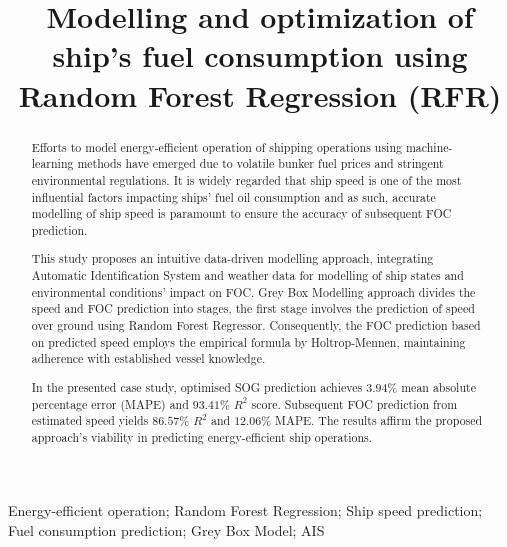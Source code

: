 \documentclass[]{interact}
\theoremstyle{plain}%
\theoremstyle{definition}
\theoremstyle{remark}
\begin{document}

\title{Modelling and optimization of ship's fuel consumption using Random Forest Regression (RFR)}

\author{
}

\maketitle

\begin{abstract}
Efforts to model energy-efficient operation of shipping operations using machine-learning methods have emerged due to volatile bunker fuel prices and stringent environmental regulations. It is widely regarded that ship speed is one of the most influential factors impacting ships' fuel oil consumption and as such, accurate modelling of ship speed is paramount to ensure the accuracy of subsequent FOC prediction.

This study proposes an intuitive data-driven modelling approach, integrating Automatic Identification System and weather data for modelling of ship states and environmental conditions' impact on FOC. Grey Box Modelling approach divides the speed and FOC prediction into stages, the first stage involves the prediction of speed over ground using Random Forest Regressor. Consequently, the FOC prediction based on predicted speed employs the empirical formula by Holtrop-Mennen, maintaining adherence with established vessel knowledge.
  
In the presented case study, optimised SOG prediction achieves $3.94\%$ mean absolute percentage error (MAPE) and $93.41\%$ $R^2$ score. Subsequent FOC prediction from estimated speed yields $86.57\%$ $R^2$ and $12.06\%$ MAPE. The results affirm the proposed approach's viability in predicting energy-efficient ship operations.
\end{abstract}

\begin{keywords}
Energy-efficient operation; Random Forest Regression; Ship speed prediction; Fuel consumption prediction; Grey Box Model; AIS 
\end{keywords}
\end{document}
